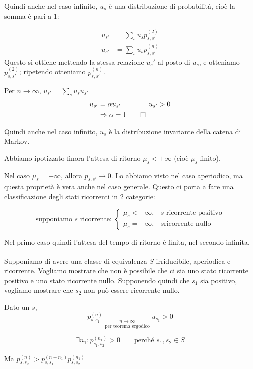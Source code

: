 \documentclass[a4paper,12pt]{book}
\begin{document}
Quindi anche nel caso infinito, $ u_s $ è una distribuzione di probabilità, cioè la somma è pari a 1:

\begin{align*}
	u_{s'} & = \sum_{s} u_s p_{s,s'}^{(2)} \\
	u_{s'} & = \sum_{s} u_s p_{s,s'} ^{(n)}
\end{align*}
Questo si ottiene mettendo la stessa relazione $ u_s' $ al posto di $ u_s $, e otteniamo $ p_{s,s'}^{(2)} $; ripetendo otteniamo $ p_{s,s'}^{(n)} $.

Per $ n \to \infty $, $ u_{s'} = \sum_{s} u_su_{s'}$
\begin{align*}
u_{s'} & = \alpha u_{s'} \qquad \qquad u_{s'} > 0 \\
& \Rightarrow \alpha = 1 \qed
\end{align*}

Quindi anche nel caso infinito, $ u_s $ è la distribuzione invariante della catena di Markov.

Abbiamo ipotizzato finora l'attesa di ritorno $\mu_s < +\infty$ (cioè $\mu_s$ finito).

Nel caso $\mu_s = + \infty$, allora $ p_{s,s'} \to 0 $. Lo abbiamo visto nel caso aperiodico, ma questa proprietà è vera anche nel caso generale. Questo ci porta a fare una classificazione degli stati ricorrenti in 2 categorie:

$$ \text{supponiamo } s \text{ ricorrente: } \begin{cases*}
	\mu_s < +\infty, & s \text{ ricorrente positivo} \\
	\mu_s = + \infty, & s \text{ricorrente nullo}
\end{cases*}$$

Nel primo caso quindi l'attesa del tempo di ritorno è finita, nel secondo infinita. 
\\
\\
Supponiamo di avere una classe di equivalenza $ S $ irriducibile, aperiodica e ricorrente. Vogliamo mostrare che non è possibile che ci sia uno stato ricorrente positivo e uno stato ricorrente nullo. Supponendo quindi che $ s_1 $ sia positivo, vogliamo mostrare che $ s_2 $ non può essere ricorrente nullo. 

Dato un $ s $,
$$ p_{s,s{_1}}^{(n)} \underset{\text{per teorema ergodico}}{\underset{n \to \infty}{\longrightarrow}} u_{s_{1}} > 0$$

$$ \exists n_1 : p_{s_1, s_2}^{(n_1)} > 0 \qquad \text{perché } s_1, s_2 \in S  $$

Ma $ p_{s,s_2}^{(n)} > p_{s,s_1}^{(n - n_1)} p_{s,s_2}^{(n_1)} $
\end{document}
